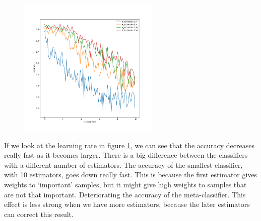 \documentclass[11pt]{article}
\begin{document}
\begin{figure}[h]
	\centering
	\includegraphics[width=0.6\textwidth]{images/ex2_5_lr_estimators}
	\caption{}
	\label{fig:lr}
\end{figure}



If we look at the learning rate in figure \ref{fig:lr}, we can see that the accuracy decreases really fast as it becomes larger. There is a big difference between the classifiers with a different number of estimators. The accuracy of the smallest classifier, with 10 estimators, goes down really fast. This is because the first estimator gives weights to `important' samples, but it might give high weights to samples that are not that important. Deteriorating the accuracy of the meta-classifier.
This effect is less strong when we have more estimators, because the later estimators can correct this result.
\end{document}
